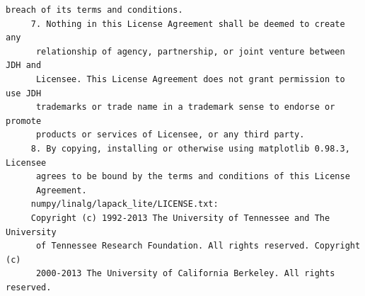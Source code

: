 \begin{lstlisting}[basicstyle=\ttfamily\footnotesize,breaklines=true]
      breach of its terms and conditions.
     7. Nothing in this License Agreement shall be deemed to create any
      relationship of agency, partnership, or joint venture between JDH and
      Licensee. This License Agreement does not grant permission to use JDH
      trademarks or trade name in a trademark sense to endorse or promote
      products or services of Licensee, or any third party.
     8. By copying, installing or otherwise using matplotlib 0.98.3, Licensee
      agrees to be bound by the terms and conditions of this License
      Agreement.
     numpy/linalg/lapack_lite/LICENSE.txt:
     Copyright (c) 1992-2013 The University of Tennessee and The University
      of Tennessee Research Foundation. All rights reserved. Copyright (c)
      2000-2013 The University of California Berkeley. All rights reserved.





\end{lstlisting}

